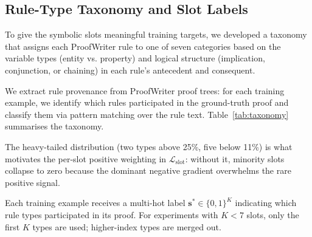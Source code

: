 \documentclass[conference]{IEEEtran}
\begin{document}
\subsection{Rule-Type Taxonomy and Slot Labels}
\label{sec:taxonomy}

To give the symbolic slots meaningful training targets, we
developed a taxonomy that assigns each ProofWriter rule to one
of seven categories based on the variable types (entity vs.
property) and logical structure (implication, conjunction, or
chaining) in each rule's antecedent and consequent.

We extract rule provenance from ProofWriter proof trees: for each
training example, we identify which rules participated in the
ground-truth proof and classify them via pattern matching over the
rule text. Table~\ref{tab:taxonomy} summarises the taxonomy.

\begin{table}[t]
\centering
\small
\caption{Rule-type taxonomy derived from ProofWriter rules.
\emph{Freq.}\ is the fraction of training examples where each
type appears in the proof.}
\label{tab:taxonomy}
\end{table}

The heavy-tailed distribution (two types above 25\%, five below
11\%) is what motivates the per-slot positive weighting in
$\mathcal{L}_\text{slot}$: without it, minority slots collapse to
zero because the dominant negative gradient overwhelms the rare
positive signal.

Each training example receives a multi-hot label
$\mathbf{s}^* \in \{0,1\}^K$ indicating which rule types
participated in its proof. For experiments with $K < 7$ slots,
only the first $K$ types are used; higher-index types are merged out.
\end{document}
